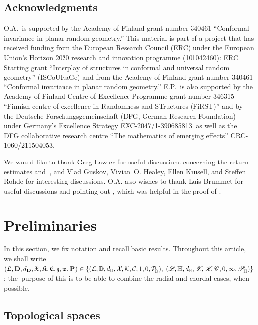 \documentclass[a4paper, 11pt]{article}
\theoremstyle{definition}
\numberwithin{equation}{section}
\numberwithin{figure}{section}
\newcommand{\rLoewnerTransform}[1][]{\cL{\ifx&#1&\else_{#1}\fi}}
\newcommand{\cLoewnerTransform}[1][]{\mathscr{L}_{\ifx&#1&\else#1\fi}}
\newcommand{\LLoewnerTransform}[1][]{\mathfrak{L}_{\ifx&#1&\else#1\fi}}
\newcommand\Dhulls[1][]{\cK_{#1}}
\newcommand{\Khulls}[1][]{\mathfrak{K}_{#1}}
\newcommand{\Hhulls}[1][]{\mathscr{K}_{#1}}
\newcommand{\Dpaths}[1][]{\cX_{#1}}
\newcommand{\Hpaths}[1][]{\mathscr{X}_{#1}} %
\newcommand{\Xpaths}[1][]{\mathfrak{X}_{#1}}
\newcommand{\dD}{d_{\bD}}
\newcommand{\dH}{d_{\bH}}
\newcommand{\dX}{d_{\Ddomain}}
\newcommand{\Ddomain}{\mathbf{D}}
\newcommand{\targetpoint}{\mathfrak{w}}
\newcommand{\beginpoint}{\mathfrak{z}}
\newcommand{\rDmeas}[1]{\mathcal{P}^{#1}_{\!\bD}}
\newcommand{\cHmeas}[1]{\mathscr{P}^{#1}_{\!\bH}}
\newcommand{\Xmeasure}[2][]{\mathbf{P}^{#2}_{\!#1}}
\begin{document}
\subsection*{Acknowledgments}

O.A.~is supported by the Academy of Finland grant number 340461 ``Conformal invariance in planar random geometry.''
This material is part of a project that has received funding from the  European Research Council (ERC) under the European Union's Horizon 2020 research and innovation programme (101042460): 
ERC Starting grant ``Interplay of structures in conformal and universal random geometry'' (ISCoURaGe) 
and from the Academy of Finland grant number 340461 ``Conformal invariance in planar random geometry.''
E.P.~is also supported by 
the Academy of Finland Centre of Excellence Programme grant number 346315 ``Finnish centre of excellence in Randomness and STructures (FiRST)'' 
and by the Deutsche Forschungsgemeinschaft (DFG, German Research Foundation) under Germany's Excellence Strategy EXC-2047/1-390685813, 
as well as the DFG collaborative research centre ``The mathematics of emerging effects'' CRC-1060/211504053.


We would like to thank 
Greg Lawler for useful discussions concerning the return estimates and~\cite{Lawler:Minkowski_content_of_intersection_of_SLE_curve_with_real_line}, 
and Vlad Guskov, Vivian~O. Healey, Ellen Krusell, and Steffen Rohde for interesting discussions. 
O.A. also wishes to thank Luis Brummet for useful discussions and pointing out \cite[Proposition~6.5]{Berestrycki-Norris:Lecture_notes_on_SLE}, 
which was helpful in the proof of .%

\section{Preliminaries} 
\label{sec:preliminaries}
In this section, we fix notation and recall basic results. 
Throughout this article, we shall write 
$(\LLoewnerTransform, \Ddomain, \dX, \Xpaths, \Khulls, \Ccompsets, \beginpoint, \targetpoint, \Xmeasure{}) \in \{
(\rLoewnerTransform, \bD, \dD, \Dpaths, \Dhulls, \Dcompsets, 1, 0, \rDmeas{}), \; (\cLoewnerTransform, \bH, \dH, \Hpaths, \Hhulls, \Hcompsets, 0, \infty, \cHmeas{})\}$; 
the~purpose of this is to be able to combine the radial and chordal cases, when possible.


\subsection{Topological spaces}
\end{document}
